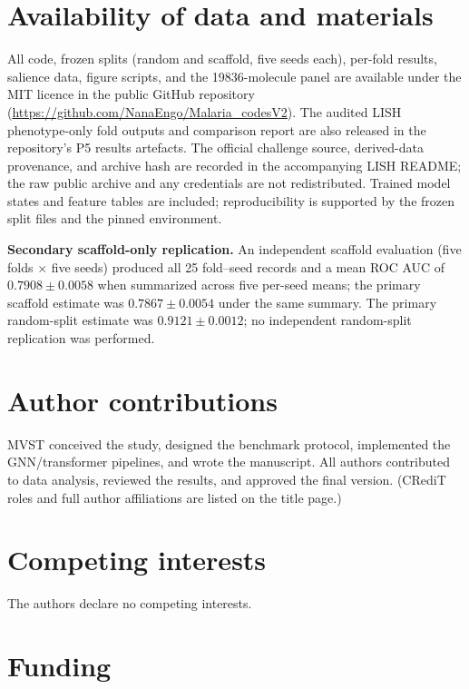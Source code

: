 \documentclass[11pt,a4paper]{article}
\begin{document}
\section{Availability of data and materials}

All code, frozen splits (random and scaffold, five seeds each), per-fold results, salience data, figure scripts, and the \num{19836}-molecule panel are available under the MIT licence in the public GitHub repository (\url{https://github.com/NanaEngo/Malaria_codesV2}). The audited LISH phenotype-only fold outputs and comparison report are also released in the repository's P5 results artefacts. The official challenge source, derived-data provenance, and archive hash are recorded in the accompanying LISH README; the raw public archive and any credentials are not redistributed. Trained model states and feature tables are included; reproducibility is supported by the frozen split files and the pinned environment.

\noindent\textbf{Secondary scaffold-only replication.} An independent scaffold evaluation (five folds $\times$ five seeds) produced all \num{25} fold--seed records and a mean ROC AUC of $\num{0.7908} \pm \num{0.0058}$ when summarized across five per-seed means; the primary scaffold estimate was $\num{0.7867} \pm \num{0.0054}$ under the same summary. The primary random-split estimate was $\num{0.9121} \pm \num{0.0012}$; no independent random-split replication was performed.

\section{Author contributions}

MVST conceived the study, designed the benchmark protocol, implemented the GNN/transformer pipelines, and wrote the manuscript. All authors contributed to data analysis, reviewed the results, and approved the final version. (CRediT roles and full author affiliations are listed on the title page.)

\section{Competing interests}

The authors declare no competing interests.

\section{Funding}
\end{document}
